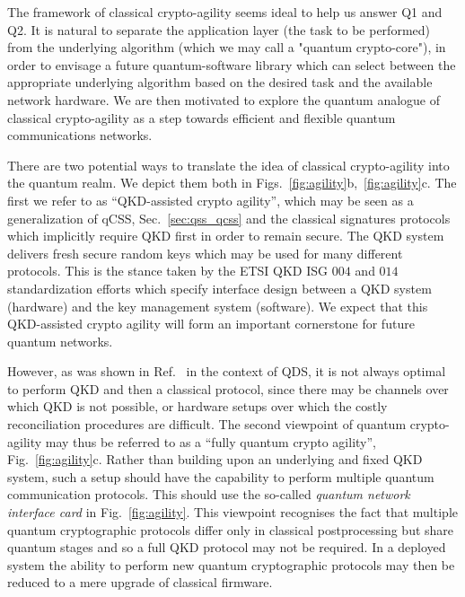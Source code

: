 The framework of classical crypto-agility seems ideal to help us answer Q1 and Q2. It is natural to separate the application layer (the task to be performed) from the underlying algorithm (which we may call a "quantum crypto-core"), in order to envisage a future quantum-software library which can select between the appropriate underlying algorithm based on the desired task and the available network hardware. We are then motivated to explore the quantum analogue of classical crypto-agility as a step towards efficient and flexible quantum communications networks.





There are two potential ways to translate the idea of classical crypto-agility into the quantum realm. We depict them both in Figs.~\ref{fig:agility}b,~\ref{fig:agility}c. The first we refer to as ``QKD-assisted crypto agility'', which may be seen as a generalization of qCSS, Sec.~\ref{sec:qss_qcss} and the classical signatures protocols \cite{Wallden2015, Amiri2016a} which implicitly require QKD first in order to remain secure. The QKD system delivers fresh secure random keys which may be used for many different protocols. This is the stance taken by the ETSI QKD ISG $004$ \cite{ETSI004} and $014$ \cite{ETSI014} standardization efforts which specify interface design between a QKD system (hardware) and the key management system (software). We expect that this QKD-assisted crypto agility will form an important cornerstone for future quantum networks. %

However, as was shown in Ref.~\cite{Amiri2016} in the context of QDS, it is not always optimal to perform QKD and then a classical protocol, since there may be channels over which QKD is not possible, or hardware setups over which the costly reconciliation procedures are difficult. The second viewpoint of quantum crypto-agility may thus be referred to as a ``fully quantum crypto agility'', Fig.~\ref{fig:agility}c. Rather than building upon an underlying and fixed QKD system, such a setup should have the capability to perform multiple quantum communication protocols. This should use the so-called \emph{quantum network interface card} in Fig.~\ref{fig:agility}. This viewpoint recognises the fact that multiple quantum cryptographic protocols differ only in classical postprocessing but share quantum stages and so a full QKD protocol may not be required. %
In a deployed system the ability to perform new quantum cryptographic protocols may then be reduced to a mere upgrade of classical firmware.


